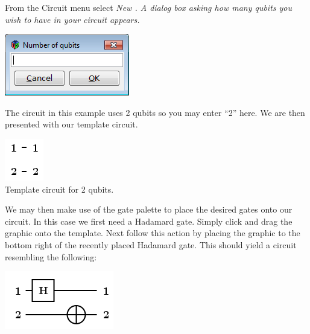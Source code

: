 \documentclass[10pt]{article}
\theoremstyle{definition}
\begin{document}
\newpage
From the Circuit menu select \em New \em. A dialog box asking how many qubits you wish to have in your circuit appears. 

\begin{center}
\includegraphics{Figures/CreateCircuit/NumberOfQubits.png}
\end{center}

The circuit in this example uses 2 qubits so you may enter ``2'' here. We are then presented with our template circuit.
\begin{center}
\includegraphics[scale=.7]{Figures/CreateCircuit/TemplateCircuit}\\
Template circuit for 2 qubits.
\end{center}
\hspace{1em}

We may then make use of the gate palette to place the desired gates onto our circuit. In this case we first need a Hadamard gate. Simply click and drag the  graphic onto the template. Next follow this action by placing the  graphic to the bottom right of the recently placed Hadamard gate. This should yield a circuit resembling the following:

\begin{center}
\includegraphics[scale=.7]{Figures/CreateCircuit/EPRCircuit2}
\end{center}
\end{document}
